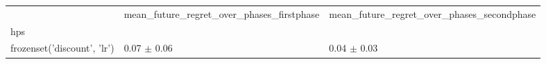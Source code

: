 \begin{tabular}{lll}
\toprule
 & mean_future_regret_over_phases_firstphase & mean_future_regret_over_phases_secondphase \\
hps &  &  \\
\midrule
frozenset({'discount', 'lr'}) & 0.07 $\pm$ 0.06 & 0.04 $\pm$ 0.03 \\
\bottomrule
\end{tabular}
